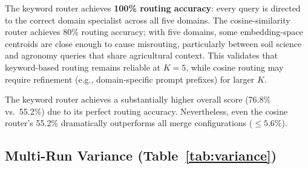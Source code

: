 \documentclass[conference, 10pt]{IEEEtran}
\begin{document}
\begin{table}[htbp]
\centering
\caption{Router comparison: keyword-based vs.\ cosine-similarity routing
across $K=5$ domains ($\%$). The keyword router achieves 100\% routing accuracy;
the cosine router achieves 80\%.}
\label{tab:router-comparison}
\end{table}

The keyword router achieves \textbf{100\% routing accuracy}: every query is
directed to the correct domain specialist across all five domains.
The cosine-similarity router achieves 80\% routing accuracy; with five
domains, some embedding-space centroids are close enough to cause
misrouting, particularly between soil science and agronomy queries
that share agricultural context.
This validates that keyword-based routing remains reliable at $K=5$,
while cosine routing may require refinement (e.g., domain-specific
prompt prefixes) for larger $K$.

The keyword router achieves a substantially higher overall score (76.8\%
vs.\ 55.2\%) due to its perfect routing accuracy.
Nevertheless, even the cosine router's 55.2\% dramatically outperforms
all merge configurations ($\leq 5.6\%$).

\subsection{Multi-Run Variance (Table~\ref{tab:variance})}
\end{document}

